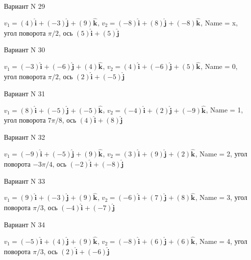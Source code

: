\documentclass[11pt]{report}
\begin{document}
Вариант N 29

$v_1 = \left(4\right)\mathbf{\hat{i}_{}} + \left(-3\right)\mathbf{\hat{j}_{}} + \left(9\right)\mathbf{\hat{k}_{}}$, $v_2 = \left(-8\right)\mathbf{\hat{i}_{}} + \left(8\right)\mathbf{\hat{j}_{}} + \left(-8\right)\mathbf{\hat{k}_{}}$, Name = x, угол поворота $\pi / 2$, ось $\left(5\right)\mathbf{\hat{i}_{}} + \left(5\right)\mathbf{\hat{j}_{}}$

Вариант N 30

$v_1 = \left(-3\right)\mathbf{\hat{i}_{}} + \left(-6\right)\mathbf{\hat{j}_{}} + \left(4\right)\mathbf{\hat{k}_{}}$, $v_2 = \left(4\right)\mathbf{\hat{i}_{}} + \left(-6\right)\mathbf{\hat{j}_{}} + \left(5\right)\mathbf{\hat{k}_{}}$, Name = 0, угол поворота $\pi / 2$, ось $\left(2\right)\mathbf{\hat{i}_{}} + \left(-5\right)\mathbf{\hat{j}_{}}$

Вариант N 31

$v_1 = \left(8\right)\mathbf{\hat{i}_{}} + \left(-5\right)\mathbf{\hat{j}_{}} + \left(-5\right)\mathbf{\hat{k}_{}}$, $v_2 = \left(-4\right)\mathbf{\hat{i}_{}} + \left(2\right)\mathbf{\hat{j}_{}} + \left(-9\right)\mathbf{\hat{k}_{}}$, Name = 1, угол поворота $7 \pi / 8$, ось $\left(4\right)\mathbf{\hat{i}_{}} + \left(8\right)\mathbf{\hat{j}_{}}$

Вариант N 32

$v_1 = \left(-9\right)\mathbf{\hat{i}_{}} + \left(-5\right)\mathbf{\hat{j}_{}} + \left(9\right)\mathbf{\hat{k}_{}}$, $v_2 = \left(3\right)\mathbf{\hat{i}_{}} + \left(9\right)\mathbf{\hat{j}_{}} + \left(2\right)\mathbf{\hat{k}_{}}$, Name = 2, угол поворота $- 3 \pi / 4$, ось $\left(-2\right)\mathbf{\hat{i}_{}} + \left(-8\right)\mathbf{\hat{j}_{}}$

Вариант N 33

$v_1 = \left(9\right)\mathbf{\hat{i}_{}} + \left(-3\right)\mathbf{\hat{j}_{}} + \left(9\right)\mathbf{\hat{k}_{}}$, $v_2 = \left(-6\right)\mathbf{\hat{i}_{}} + \left(7\right)\mathbf{\hat{j}_{}} + \left(8\right)\mathbf{\hat{k}_{}}$, Name = 3, угол поворота $\pi / 3$, ось $\left(-4\right)\mathbf{\hat{i}_{}} + \left(-7\right)\mathbf{\hat{j}_{}}$

Вариант N 34

$v_1 = \left(-5\right)\mathbf{\hat{i}_{}} + \left(4\right)\mathbf{\hat{j}_{}} + \left(9\right)\mathbf{\hat{k}_{}}$, $v_2 = \left(-8\right)\mathbf{\hat{i}_{}} + \left(6\right)\mathbf{\hat{j}_{}} + \left(6\right)\mathbf{\hat{k}_{}}$, Name = 4, угол поворота $\pi / 3$, ось $\left(2\right)\mathbf{\hat{i}_{}} + \left(-6\right)\mathbf{\hat{j}_{}}$
\end{document}
